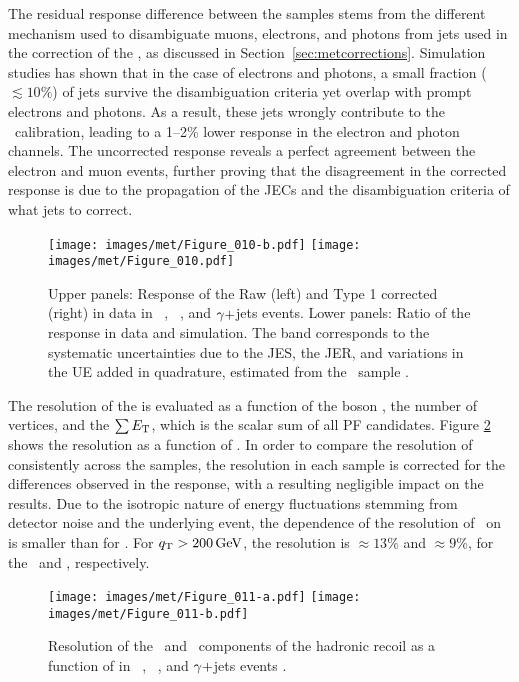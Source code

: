 The residual response difference between the samples stems from the different mechanism used to disambiguate muons, electrons, and photons from jets used in the correction of the \ptmiss, as discussed in Section~\ref{sec:metcorrections}. 
Simulation studies has shown that in the case of electrons and photons, a small fraction ($\lesssim 10\%$) of jets survive the disambiguation criteria yet overlap with prompt electrons and photons. 
As a result, these jets wrongly contribute to the \ptmiss\ calibration, leading to a 1--2\% lower response in the electron and photon channels. 
The uncorrected \ptmiss response reveals a perfect agreement between the electron and muon events, further proving that the disagreement in the corrected response is due to the propagation of the JECs and the disambiguation criteria of what jets to correct.
\begin{figure}[htbp!]
  \centering
   \texttt{[image: images/met/Figure\_010-b.pdf]}
   \texttt{[image: images/met/Figure\_010.pdf]}
  \caption{Upper panels: Response of the Raw (left) and Type 1 corrected (right) \ptmiss in data in \Zmm\ , \Zee\ , and $\gamma+$jets events.  
Lower panels: Ratio of the \ptmiss response in data and simulation. 
The band corresponds to the systematic uncertainties due to the JES, the JER, and variations in the UE added in quadrature, estimated from the \Zee\ sample \cite{Sirunyan:2019kia}.}
\label{fig:response}
\end{figure}
\newpara
\noindent\justify
The resolution of the \ptmiss is evaluated as a function of the boson \qt, the number of vertices, and the $\sum E_{\mathrm{T}}$, which is the scalar \pt sum of all PF candidates.
Figure \ref{fig:resolution_qt} shows the resolution as a function of \qt. 
In order to compare the resolution of \ptmiss consistently across the samples, the resolution in each sample is corrected for the differences observed in the response, with a resulting negligible impact on the results. 
Due to the isotropic nature of energy fluctuations stemming from detector noise and the underlying event, the dependence of the resolution of \uperp\ on \qt is smaller than for \upar. 
For ${q}_{\mathrm T}>200\,\text{Ge\hspace{-.08em}V}$, the \ptmiss resolution is $\approx 13\%$ and $\approx 9\%$, for the \upar\ and \uperp, respectively.
\begin{figure}[htbp!]
  \centering
   \texttt{[image: images/met/Figure\_011-a.pdf]}
   \texttt{[image: images/met/Figure\_011-b.pdf]}
  \caption{Resolution of the \upar\ and \uperp\ components of the hadronic recoil as a function of \qt in \Zmm\ , \Zee\ , and $\gamma+$jets events \cite{Sirunyan:2019kia}.}
  \label{fig:resolution_qt}
\end{figure}                                                            
